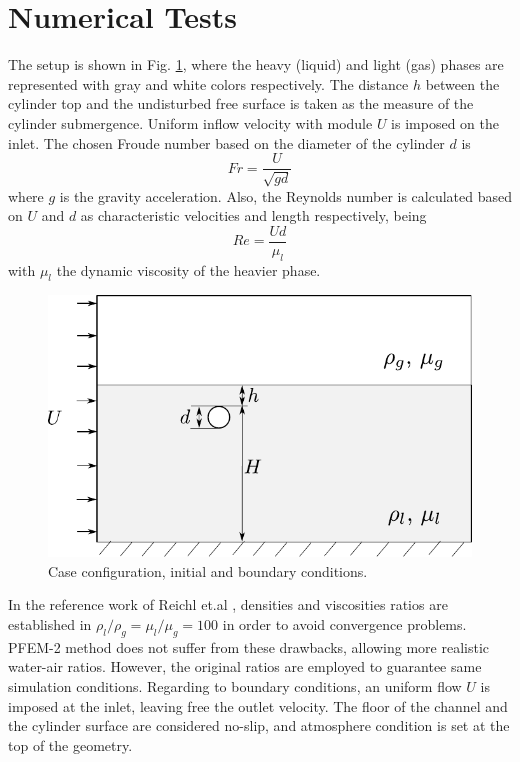 \section{Numerical Tests}

The setup is shown in Fig. \ref{fg:config}, where the heavy (liquid) and light (gas) phases are represented with gray and white colors respectively. The distance $h$ between the cylinder top and the undisturbed free surface is taken as the measure of the cylinder submergence. Uniform inflow velocity with module $U$ is imposed on the inlet. The chosen Froude number based on the diameter of the cylinder $d$ is
\begin{equation}
 Fr = \frac{U}{\sqrt{gd}}
\label{eq:froude}
\end{equation}
where $g$ is the gravity acceleration. Also, the Reynolds number is calculated based on $U$ and $d$ as characteristic velocities and length respectively, being
\begin{equation}
 Re = \frac{U d}{\mu_l}
\label{eq:reynolds}
\end{equation}
with $\mu_l$ the dynamic viscosity of the heavier phase.

\begin{figure}[ht]
  \centering
  \includegraphics[width=0.9\columnwidth]{images_10thspheric/config.pdf}
  \caption{Case configuration, initial and boundary conditions.}
  \label{fg:config}
\end{figure}

In the reference work of Reichl et.al \cite{Reichl05}, densities and viscosities ratios are established in $\rho_l/\rho_g = \mu_l/\mu_g=100$ in order to avoid convergence problems. PFEM-2 method does not suffer from these drawbacks, allowing more realistic water-air ratios. However, the original ratios are employed to guarantee same simulation conditions. Regarding to boundary conditions, an uniform flow $U$ is imposed at the inlet, leaving free the outlet velocity. The floor of the channel and the cylinder surface are considered no-slip, and atmosphere condition is set at the top of the geometry.


